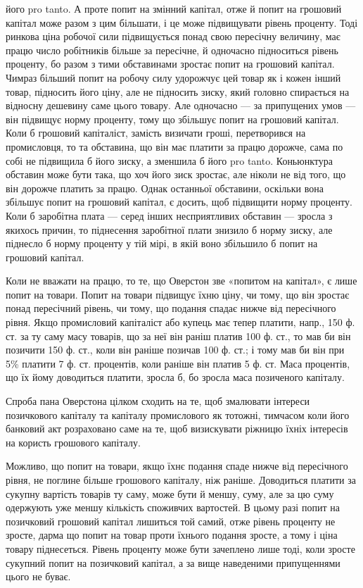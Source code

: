 \parcont{}  %
його pro tanto. А проте попит на змінний капітал, отже й попит на грошовий
капітал може разом з цим більшати, і це може підвищувати рівень проценту.
Тоді ринкова ціна робочої сили підвищується понад свою пересічну величину,
має працю число робітників більше за пересічне, й одночасно підноситься
рівень проценту, бо разом з тими обставинами зростає попит на грошовий капітал.
Чимраз більший попит на робочу силу удорожчує цей товар як і кожен інший товар,
підносить його ціну, але не підносить зиску, який головно спирається на відносну
дешевину саме цього товару. Але одночасно — за припущених умов — він підвищує
норму проценту, тому що збільшує попит на грошовий капітал. Коли б
грошовий капіталіст, замість визичати гроші, перетворився на промисловця, то
та обставина, що він має платити за працю дорожче, сама по собі не підвищила
б його зиску, а зменшила б його pro tanto. Коньюнктура обставин може
бути така, що хоч його зиск зростає, але ніколи не від того, що він дорожче
платить за працю. Однак останньої обставини, оскільки вона збільшує попит на
грошовий капітал, є досить, щоб підвищити норму проценту. Коли б заробітна
плата — серед інших несприятливих обставин — зросла з якихось причин, то
піднесення заробітної плати знизило б норму зиску, але піднесло б норму проценту
у тій мірі, в якій воно збільшило б попит на грошовий капітал.

Коли не вважати на працю, то те, що Оверстон зве «попитом на капітал»,
є лише попит на товари. Попит на товари підвищує їхню ціну, чи тому, що
він зростає понад пересічний рівень, чи тому, що подання спадає нижче від
пересічного рівня. Якщо промисловий капіталіст або купець має тепер платити,
напр., 150 ф. ст. за ту саму масу товарів, що за неї він раніш платив 100
ф. ст., то мав би він позичити 150 ф. ст., коли він раніше позичав 100 ф. ст.;
і тому мав би він при 5\% платити 7 ф. ст. процентів, коли раніше він
платив 5 ф. ст. Маса процентів, що їх йому доводиться платити, зросла б,
бо зросла маса позиченого капіталу.

Спроба пана Оверстона цілком сходить на те, щоб змалювати інтереси позичкового
капіталу та капіталу промислового як тотожні, тимчасом коли його
банковий акт розраховано саме на те, щоб визискувати ріжницю їхніх інтересів
на користь грошового капіталу.

Можливо, що попит на товари, якщо їхнє подання спаде нижче від пересічного
рівня, не поглине більше грошового капіталу, ніж раніше. Доводиться
платити за сукупну вартість товарів ту саму, може бути й меншу, суму, але
за цю суму одержують уже меншу кількість споживчих вартостей. В цьому разі
попит на позичковий грошовий капітал лишиться той самий, отже рівень проценту
не зросте, дарма що попит на товар проти їхнього подання зросте, а тому
і ціна товару піднесеться. Рівень проценту може бути зачеплено лише тоді,
коли зросте сукупний попит на позичковий капітал, а за вище наведеними припущеннями цього не буває.

